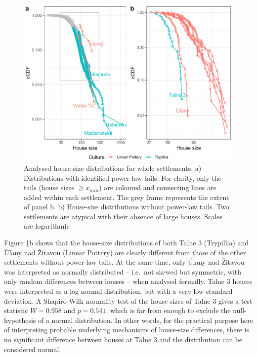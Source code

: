 \documentclass[
  12pt,
  a4paper, twoside]{book}
\begin{document}
\begin{figure}

{\centering \includegraphics[width=0.9\linewidth]{bookdown-demo_files/figure-latex/06-settle-tails-1} 

}

\caption[House sizes and tail models, settlements]{Analysed house-size distributions for whole settlements. a) Distributions with identified power-law tails. For clarity, only the tails (house sizes \(\geq x_{min}\)) are coloured and connecting lines are added within each settlement. The grey frame represents the extent of panel b. b) House-size distributions without power-law tails. Two settlements are atypical with their absence of large houses. Scales are logarithmic}\label{fig:06-settle-tails}
\end{figure}

Figure \ref{fig:06-settle-tails}b shows that the house-size distributions of both Talne 3 (Trypillia) and Úľany nad Žitavou (Linear Pottery) are clearly different from those of the other settlements without power-law tails. At the same time, only Úľany nad Žitavou was interpreted as normally distributed -- i.e.~not skewed but symmetric, with only random differences between houses -- when analysed formally. Talne 3 houses were interpreted as a log-normal distribution, but with a very low standard deviation. A Shapiro-Wilk normality test of the house sizes of Talne 3 gives a test statistic \(W = 0.958\) and \(p = 0.541\), which is far from enough to exclude the null-hypothesis of a normal distribution. In other words, for the practical purpose here of interpreting probable underlying mechanisms of house-size differences, there is no significant difference between houses at Talne 3 and the distribution can be considered normal.
\end{document}
